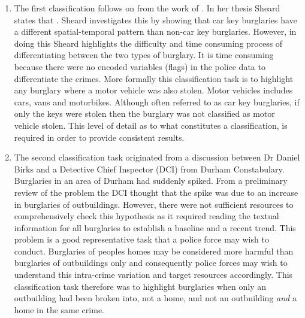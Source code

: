 \begin{enumerate}
   
\item The first classification follows on from the work of \parencite{sheard2020developing}. In her thesis Sheard states that . Sheard investigates this by showing that car key burglaries have a different spatial-temporal pattern than non-car key burglaries. However, in doing this Sheard highlights the difficulty and time consuming process of differentiating between the two types of burglary. It is time consuming because there were no encoded variables (flags) in the police data to differentiate the crimes. More formally this classification task is to highlight any burglary where a motor vehicle was also stolen. Motor vehicles includes cars, vans and motorbikes. Although often referred to as car key burglaries, if only the keys were stolen then the burglary was not classified as motor vehicle stolen. This level of detail as to what constitutes a classification, is required in order to provide consistent results. 

 \item The second classification task originated from a discussion between Dr Daniel Birks and a Detective Chief Inspector (DCI) from Durham Constabulary. Burglaries in an area of Durham had suddenly spiked. From a preliminary review of the problem the DCI thought that the spike was due to an increase in burglaries of outbuildings. However, there were not sufficient resources to comprehensively check this hypothesis as it required reading the textual information for all burglaries to establish a baseline and a recent trend. This problem is a good representative task that a police force may wish to conduct. Burglaries of peoples homes may be considered more harmful than burglaries of outbuildings only and consequently police forces may wish to understand this intra-crime variation and target resources accordingly.  This classification task therefore was to highlight burglaries when only an outbuilding had been broken into, not a home, and not an outbuilding \emph{and} a home in the same crime.  



\end{enumerate}
